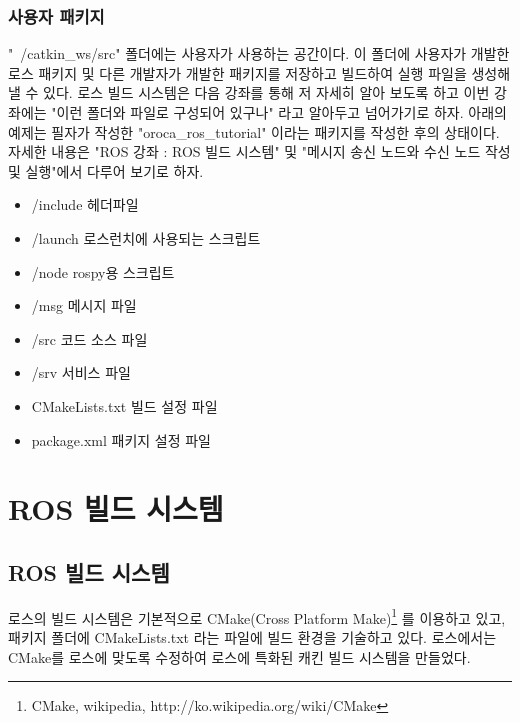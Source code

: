 \subsubsection{사용자 패키지}

"~/catkin\_ws/src" 폴더에는 사용자가 사용하는 공간이다. 이 폴더에 사용자가 개발한 로스 패키지 및 다른 개발자가 개발한 패키지를 저장하고 빌드하여 실행 파일을 생성해 낼 수 있다. 로스 빌드 시스템은 다음 강좌를 통해 저 자세히 알아 보도록 하고 이번 강좌에는 "이런 폴더와 파일로 구성되어 있구나" 라고 알아두고 넘어가기로 하자. 아래의 예제는 필자가 작성한 "oroca\_ros\_tutorial" 이라는 패키지를 작성한 후의 상태이다. 자세한 내용은 "ROS 강좌 : ROS 빌드 시스템" 및 "메시지 송신 노드와 수신 노드 작성 및 실행"에서 다루어 보기로 하자.

\begin{itemize}
\item /include 헤더파일
\item /launch 로스런치에 사용되는 스크립트
\item /node rospy용 스크립트
\item /msg 메시지 파일
\item /src 코드 소스 파일
\item /srv 서비스 파일
\item CMakeLists.txt 빌드 설정 파일
\item package.xml 패키지 설정 파일
\end{itemize}

\section{ROS 빌드 시스템}

\subsection{ROS 빌드 시스템}

로스의 빌드 시스템은 기본적으로 CMake(Cross Platform Make)\footnote{CMake, wikipedia, http://ko.wikipedia.org/wiki/CMake} 를 이용하고 있고, 패키지 폴더에 CMakeLists.txt 라는 파일에 빌드 환경을 기술하고 있다. 로스에서는 CMake를 로스에 맞도록 수정하여 로스에 특화된 캐킨 빌드 시스템을 만들었다. 

